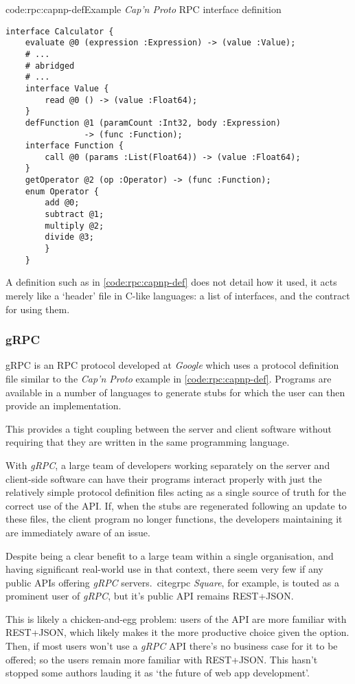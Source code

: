 \begin{codelisting}{code:rpc:capnp-def}{Example \emph{Cap'n Proto} RPC interface definition~\cite{capnp_example}}
\begin{verbatim}
interface Calculator {
    evaluate @0 (expression :Expression) -> (value :Value);
    # ...
    # abridged
    # ...
    interface Value {
        read @0 () -> (value :Float64);
    }
    defFunction @1 (paramCount :Int32, body :Expression)
                -> (func :Function);
    interface Function {
        call @0 (params :List(Float64)) -> (value :Float64);
    }
    getOperator @2 (op :Operator) -> (func :Function);
    enum Operator {
        add @0;
        subtract @1;
        multiply @2;
        divide @3;
        }
    }
\end{verbatim}
\end{codelisting}

A definition such as in \cref{code:rpc:capnp-def} does not detail how it used, it acts merely like a `header' file in C-like languages: a list of interfaces, and the contract  for using them.

\subsubsection{gRPC} \label{soln:rpc:grpc}

gRPC is an RPC protocol developed at \emph{Google} which uses a protocol definition file similar to the \emph{Cap'n Proto} example in \cref{code:rpc:capnp-def}. Programs are available in a number of languages to generate stubs for which the user can then provide an implementation. \cite{grpc}

This provides a tight coupling between the server and client software without requiring that they are written in the same programming language.

With \emph{gRPC}, a large team of developers working separately on the server and client-side software can have their programs interact properly with just the relatively simple protocol definition files acting as a single source of truth for the correct use of the API. If, when the stubs are regenerated following an update to these files, the client program no longer functions, the developers maintaining it are immediately aware of an issue.

Despite being a clear benefit to a large team within a single organisation, and having significant real-world use in that context, there seem very few if any public APIs offering \emph{gRPC} servers.~cite{grpc} \emph{Square}, for example, is touted as a prominent user of \emph{gRPC}, but it's public API remains REST+JSON.~\cite{square_api}

This is likely a chicken-and-egg problem: users of the API are more familiar with REST+JSON, which likely makes it the more productive  choice given the option. Then, if most users won't use a \emph{gRPC} API there's no business case for it to be offered; so the users remain more familiar with REST+JSON. This hasn't stopped some authors lauding it as `the future of web app development'.~\cite{grpc_web}